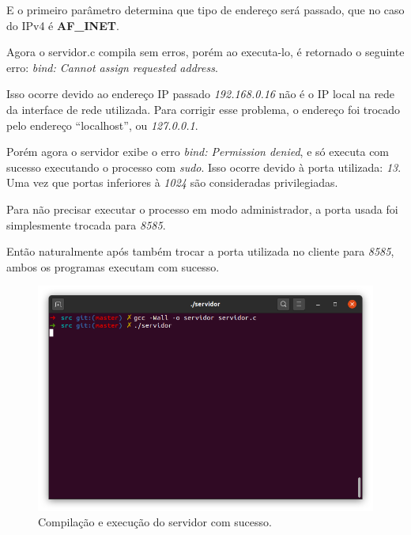 \documentclass[12pt,a4paper]{report}
\begin{document}
E o primeiro parâmetro determina que tipo de endereço será passado, que no caso do IPv4 é \textbf{AF\_INET}.


\bigbreak

Agora o servidor.c compila sem erros, porém ao executa-lo, é retornado o seguinte erro: \emph{bind: Cannot assign requested address}.

Isso ocorre devido ao endereço IP passado \emph{192.168.0.16} não é o IP local na rede da interface de rede utilizada. Para corrigir esse problema, o endereço foi trocado pelo endereço ``localhost'', ou \emph{127.0.0.1}.

\bigbreak

Porém agora o servidor exibe o erro \emph{bind: Permission denied}, e só executa com sucesso executando o processo com \emph{sudo}. Isso ocorre devido à porta utilizada: \emph{13}. Uma vez que portas inferiores à \emph{1024} são consideradas privilegiadas.

Para não precisar executar o processo em modo administrador, a porta usada foi simplesmente trocada para \emph{8585}.

\bigbreak

Então naturalmente após também trocar a porta utilizada no cliente para \emph{8585}, ambos os programas executam com sucesso.

\begin{figure}[H]
  \includegraphics[width=\linewidth]{servidor.png}
  \caption{Compilação e execução do servidor com sucesso.}
\end{figure}
\end{document}
